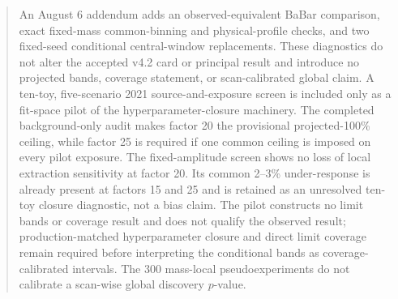 \documentclass[11pt]{article}
\begin{document}
\begin{abstract}
An August 6 addendum adds an observed-equivalent BaBar comparison, exact
fixed-mass common-binning and physical-profile checks, and two fixed-seed
conditional central-window replacements. These diagnostics do not alter the
accepted v4.2 card or principal result and introduce no projected bands,
coverage statement, or scan-calibrated global claim.
A ten-toy, five-scenario 2021 source-and-exposure screen is included only as a
fit-space pilot of the hyperparameter-closure machinery. The completed
background-only audit makes factor 20 the provisional projected-100\% ceiling, while
factor 25 is required if one common ceiling is imposed on every pilot exposure.
The fixed-amplitude screen shows no loss of local extraction sensitivity at factor 20.
Its common 2--3\% under-response is already present at factors 15 and 25 and is retained
as an unresolved ten-toy closure diagnostic, not a bias claim. The pilot constructs no
limit bands or coverage result and does not qualify the observed result;
production-matched hyperparameter closure and direct limit coverage remain required
before interpreting the conditional bands as coverage-calibrated intervals. The
300 mass-local pseudoexperiments do not calibrate a scan-wise global discovery
$p$-value.
\end{abstract}

\tableofcontents
\clearpage


\clearpage








\appendix



\clearpage


\clearpage


\end{document}

